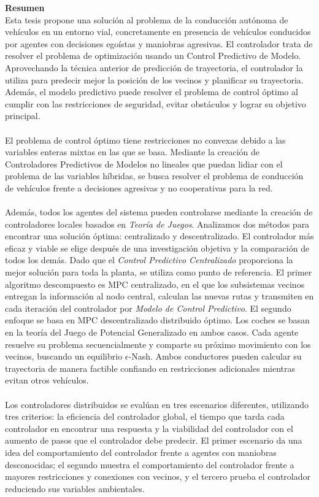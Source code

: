 \newpage
\textbf{\LARGE Resumen}
\vspace{1cm}
\\
Esta tesis propone una solución al problema de la conducción autónoma de vehículos en un entorno vial, concretamente en presencia de vehículos conducidos por agentes con decisiones egoístas y maniobras agresivas. El controlador trata de resolver el problema de optimización usando un Control Predictivo de Modelo. Aprovechando la técnica anterior de predicción de trayectoria, el controlador la utiliza para predecir mejor la posición de los vecinos y planificar su trayectoria. Además, el modelo predictivo puede resolver el problema de control óptimo al cumplir con las restricciones de seguridad, evitar obstáculos y lograr su objetivo principal.
\\
\\
El problema de control óptimo tiene restricciones no convexas debido a las variables enteras mixtas en las que se basa. Mediante la creación de Controladores Predictivos de Modelos no lineales que puedan lidiar con el problema de las variables híbridas, se busca resolver el problema de conducción de vehículos frente a decisiones agresivas y no cooperativas para la red.
\\
\\
Además, todos los agentes del sistema pueden controlarse mediante la creación de controladores locales basados en \textit{Teoría de Juegos}. Analizamos dos métodos para encontrar una solución óptima: centralizado y descentralizado. El controlador más eficaz y viable se elige después de una investigación objetiva y la comparación de todos los demás. Dado que el \textit{Control Predictivo Centralizado} proporciona la mejor solución para toda la planta, se utiliza como punto de referencia. El primer algoritmo descompuesto es MPC centralizado, en el que los subsistemas vecinos entregan la información al nodo central, calculan las nuevas rutas y transmiten en cada iteración del controlador por \textit{Modelo de Control Predictivo}. El segundo enfoque se basa en MPC descentralizado distribuido óptimo. Los coches se basan en la teoría del Juego de Potencial Generalizado en ambos casos. Cada agente resuelve su problema secuencialmente y comparte su próximo movimiento con los vecinos, buscando un equilibrio $\epsilon$-Nash. Ambos conductores pueden calcular su trayectoria de manera factible confiando en restricciones adicionales mientras evitan otros vehículos.
\\
\\
Los controladores distribuidos se evalúan en tres escenarios diferentes, utilizando tres criterios: la eficiencia del controlador global, el tiempo que tarda cada controlador en encontrar una respuesta y la viabilidad del controlador con el aumento de pasos que el controlador debe predecir. El primer escenario da una idea del comportamiento del controlador frente a agentes con maniobras desconocidas; el segundo muestra el comportamiento del controlador frente a mayores restricciones y conexiones con vecinos, y el tercero prueba el controlador reduciendo sus variables ambientales.

